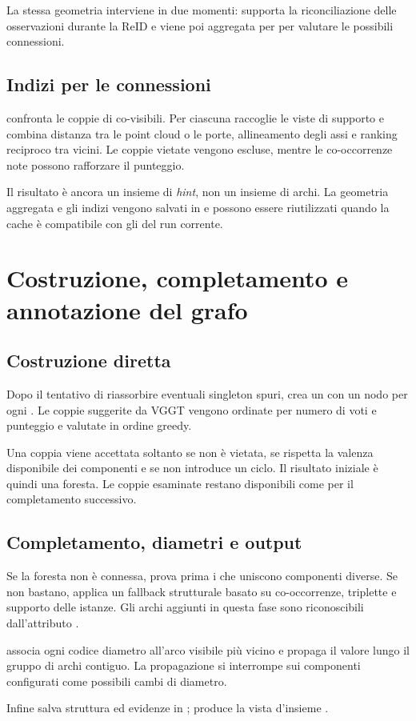 La stessa geometria interviene in due momenti: supporta la riconciliazione
delle osservazioni durante la ReID e viene poi aggregata per 
per valutare le possibili connessioni.

\subsection{Indizi per le connessioni}

 confronta le coppie di 
co-visibili. Per ciascuna raccoglie le viste di supporto e combina distanza tra
le point cloud o le porte, allineamento degli assi e ranking reciproco tra
vicini. Le coppie vietate vengono escluse, mentre le co-occorrenze note possono
rafforzare il punteggio.

Il risultato è ancora un insieme di \emph{hint}, non un insieme di archi. La
geometria aggregata e gli indizi vengono salvati in
 e possono essere riutilizzati quando la cache è
compatibile con gli  del run corrente.

\section{Costruzione, completamento e annotazione del grafo}

\subsection{Costruzione diretta}

Dopo il tentativo di riassorbire eventuali singleton spuri,
 crea un  con un nodo per ogni
. Le coppie suggerite da VGGT vengono ordinate per numero di
voti e punteggio e valutate in ordine greedy.

Una coppia viene accettata soltanto se non è vietata, se rispetta la valenza
disponibile dei componenti e se non introduce un ciclo. Il risultato iniziale
è quindi una foresta. Le coppie esaminate restano disponibili come
 per il completamento successivo.

\subsection{Completamento, diametri e output}

Se la foresta non è connessa,  prova prima i
 che uniscono componenti diverse. Se non bastano, applica un
fallback strutturale basato su co-occorrenze, triplette e supporto delle
istanze. Gli archi aggiunti in questa fase sono riconoscibili dall'attributo
.

 associa ogni codice diametro all'arco
visibile più vicino e propaga il valore lungo il gruppo di archi contiguo. La
propagazione si interrompe sui componenti configurati come possibili cambi di
diametro.

Infine  salva struttura ed evidenze in
;  produce la vista
d'insieme .

